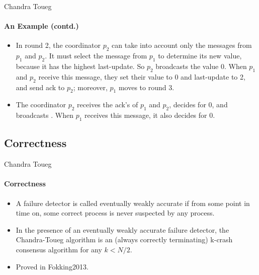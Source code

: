 \documentclass[11pt]{beamer}              %
\begin{document}
\begin{frame}{Chandra Toueg}
\framesubtitle{An Example (contd.)}
\begin{itemize}
\item In round 2, the coordinator \(p_2\) can take into account only the messages from \(p_1\) and \(p_2\). It must select the
message from \(p_1\) to determine its new value, because it has the highest last-update. So \(p_2\) broadcasts the value
0. When \(p_1\) and \(p_2\) receive this message, they set their value to 0 and last-update to 2, and send ack to \(p_2\);
moreover, \(p_1\) moves to round 3.
\item The coordinator \(p_2\) receives the ack’s of \(p_1\) and \(p_2\), decides for 0, and
broadcasts \(<decide, 0>\). When \(p_1\) receives this message, it also decides for 0.
\end{itemize}
\end{frame}

\subsection{Correctness}
\begin{frame}{Chandra Toueg}
\framesubtitle{Correctness}
\begin{itemize}
\item A failure detector is called \alert{eventually weakly accurate} if from some point in time on, some correct process is never
suspected by any process.
\item In the presence of an eventually weakly accurate failure detector, the Chandra-Toueg algorithm is an (always correctly
terminating) k-crash consensus algorithm for any \(k < N/2\).
\item Proved in \cite{Fokking2013}\alert{Fokking2013}.
\end{itemize}
\end{frame}
\end{document}

